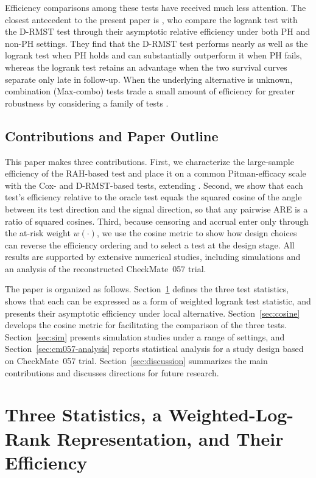 \documentclass[12pt]{article}
\begin{document}
Efficiency comparisons among these tests have received much less attention. The closest antecedent to the present paper is \citet{Tian2018}, who compare the logrank test with the D-RMST test through their asymptotic relative efficiency under both PH and non-PH settings. They find that the D-RMST test performs nearly as well as the logrank test when PH holds and can substantially outperform it when PH fails, whereas the logrank test retains an advantage when the two survival curves separate only late in follow-up. When the underlying alternative is unknown, combination (Max-combo) tests trade a small amount of efficiency for greater robustness by considering a family of tests \citep{LinEtal2020}.




\subsection{Contributions and Paper Outline}
\label{sec:contributions}

This paper makes three contributions. First, we characterize the large-sample efficiency of the RAH-based test and place it on a common Pitman-efficacy scale with the Cox- and D-RMST-based tests, extending \citet{Tian2018}. Second, we show that each test's efficiency relative to the oracle test equals the squared cosine of the angle between its test direction and the signal direction, so that any pairwise ARE is a ratio of squared cosines. Third, because censoring and accrual enter only through the at-risk weight $w(\cdot)$, we use the cosine metric to show how design choices can reverse the efficiency ordering and to select a test at the design stage. All results are supported by extensive numerical studies, including simulations and an analysis of the reconstructed CheckMate~057 trial.

The paper is organized as follows. Section~\ref{sec:setup} defines the three test statistics, shows that each can be expressed as a form of weighted logrank test statistic, and presents their asymptotic efficiency under local alternative. Section~\ref{sec:cosine} develops the cosine metric for facilitating the comparison of the three tests. Section~\ref{sec:sim} presents simulation studies under a range of settings, and Section~\ref{sec:cm057-analysis} reports statistical analysis for a study design based on CheckMate~057 trial. Section~\ref{sec:discussion} summarizes the main contributions and discusses directions for future research.

\section{Three Statistics, a Weighted-Log-Rank Representation, and Their Efficiency}
\label{sec:setup}
\end{document}
